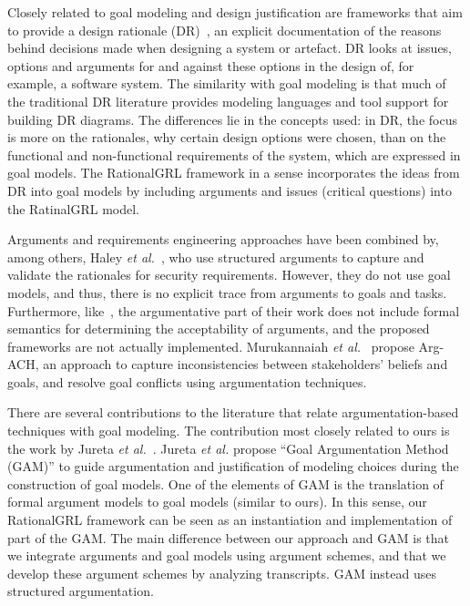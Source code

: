 Closely related to goal modeling and design justification are frameworks that aim to provide a design rationale (DR)~\cite{shum2006hypermedia}, an explicit documentation of the reasons behind decisions made when designing a system or artefact. DR looks at issues, options and arguments for and against these options in the design of, for example, a software system. The similarity with goal modeling is that much of the traditional DR literature provides modeling languages and tool support for building DR diagrams. The differences lie in the concepts used: in DR, the focus is more on the rationales, why certain design options were chosen, than on the functional and non-functional requirements of the system, which are expressed in goal models. The RationalGRL framework in a sense incorporates the ideas from DR into goal models by including arguments and issues (critical questions) into the RatinalGRL model.

Arguments and requirements engineering approaches have been combined by, among others, Haley \emph{et al.}~\cite{haley2005arguing}, who use structured arguments to capture and validate the rationales for security requirements. However, they do not use goal models, and thus, there is no explicit trace from arguments to goals and tasks. Furthermore, like~\cite{Jureta:RE2008}, the argumentative part of their work does not include formal semantics for determining the acceptability of arguments, and the proposed frameworks are not actually implemented. Murukannaiah \emph{et al.}~\cite{murukannaiah2015resolving} propose Arg-ACH, an approach to capture inconsistencies between stakeholders' beliefs and goals, and resolve goal conflicts using argumentation techniques.

There are several contributions to the literature that relate argumentation-based techniques with goal modeling. The contribution most closely related to ours is the work by Jureta \emph{et al.}~\cite{Jureta:RE2008}. Jureta \emph{et al.} propose ``Goal Argumentation Method (GAM)'' to guide argumentation and justification of modeling choices during the construction of goal models. One of the elements of GAM is the translation of formal argument models to goal models (similar to ours). In this sense, our RationalGRL framework can be seen as an instantiation and implementation of  part of the GAM. The main difference between our approach and GAM is that we integrate arguments and goal models using argument schemes, and that we develop these argument schemes by analyzing transcripts. GAM instead uses structured argumentation. 

